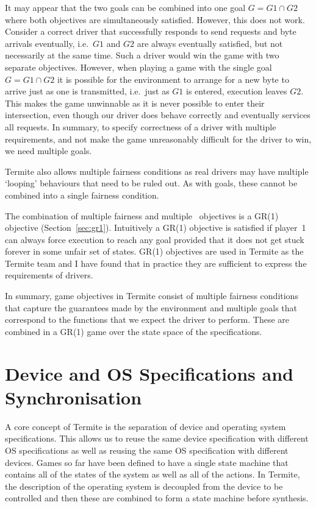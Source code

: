 It may appear that the two goals can be combined into one goal $G = G1 \cap G2$ where both objectives are simultaneously satisfied. However, this does not work. Consider a correct driver that successfully responds to send requests and byte arrivals eventually, i.e.\ $G1$ and $G2$ are always eventually satisfied, but not necessarily at the same time. Such a driver would win the game with two separate objectives. However, when playing a game with the single goal $G = G1 \cap G2$ it is possible for the environment to arrange for a new byte to arrive just as one is transmitted, i.e.\ just as $G1$ is entered, execution leaves $G2$. This makes the game unwinnable as it is never possible to enter their intersection, even though our driver does behave correctly and eventually services all requests. In summary, to specify correctness of a driver with multiple requirements, and not make the game unreasonably difficult for the driver to win, we need multiple goals. 

Termite also allows multiple fairness conditions as real drivers may have multiple `looping' behaviours that need to be ruled out. As with goals, these cannot be combined into a single fairness condition.

The combination of multiple fairness and multiple \buchi\ objectives is a GR(1) objective (Section~\ref{sec:gr1}). Intuitively a GR(1) objective is satisfied if player~1 can always force execution to reach any goal provided that it does not get stuck forever in some unfair set of states. GR(1) objectives are used in Termite as the Termite team and I have found that in practice they are sufficient to express the requirements of drivers. 

In summary, game objectives in Termite consist of multiple fairness conditions that capture the guarantees made by the environment and multiple goals that correspond to the functions that we expect the driver to perform. These are combined in a GR(1) game over the state space of the specifications.

\section{Device and OS Specifications and Synchronisation}
\label{sec:composition}

A core concept of Termite is the separation of device and operating system specifications. This allows us to reuse the same device specification with different OS specifications as well as reusing the same OS specification with different devices. Games so far have been defined to have a single state machine that contains all of the states of the system as well as all of the actions. In Termite, the description of the operating system is decoupled from the device to be controlled and then these are combined to form a state machine before synthesis.


